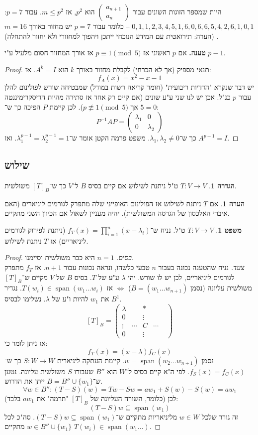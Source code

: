 \documentclass[a4paper]{article}
\DeclareMathOperator{\Sp}      {span}
\newcommand\co        {\colon}
\newcommand\pms[1]    {\begin{pmatrix}
		#1
\end{pmatrix}}
\renewcommand\lg      {\lambda}
\newcommand\op    {^{-1}}
\theoremstyle{definition}
\newtheorem{Theorem}{משפט}
\newtheorem{definition}{הגדרה}
\newtheorem{Remark}{הערה}
\newcommand\theo  [1] {\begin{Theorem}#1\end{Theorem}}
\newcommand\defi  [1] {\begin{definition}#1\end{definition}}
\newcommand\rmark [1] {\begin{Remark}#1\end{Remark}}
\begin{document}
	היות שמספר הזוגות השונים עבור $\pms{a_{n + 1} \\ a_n}$ הוא $p^2$, אז $m \le p^2$. עבור $p = 7$: \hfill $0, 1, 1, 2, 3, 4, 5, 1, 6, 0, 6, 6, 5, 4, 2, 6, 1, 0, 1$ – כלומר עבור $p = 7$ יש מחזור באורך $m = 16$. (הערה: תירואטית עם המידע הנוכחי ייתכן ויהפוך למחזורי ולא יחזור להתחלה)
	
	\textbf{טענה. }אם $p$ ראשוני אז $p \equiv 1 \pmod 5$ אז אורך המחזור חסום מלעיל ע"י $p - 1$. 
	
	\begin{proof}
		תנאי מספיק (אך לא הכרחי) לקבלת מחזור באורך $k$ הוא $A^k = I$. אז: 
		\[ f_A(x) = x^2 - x - 1 \]
		יש דבר שנקרא "הדדיות ריבועית" (חומר קריאה רשות במודל) שמבטיחה שורש לפולינום להלן עבור $p$ כנ"ל. אכן יש לנו שני ע"ע שונים (אם קיים רק אחד אז סתירה מהיות הדיסקרימיננטה $5 = 0$ אך $p \not\equiv 1 \pmod 5$). לכן קיימת $P$ הפיכה כך ש־: 
		\[ P\op AP = \pms{\lg_1 & 0 \\ 0 & \lg_2} \]
		כך ש־$\lg_1, \lg_2 \neq 0$. משפט פרמה הקטן אומר ש־$\lg_1^{p - 1}  = \lg_2^{p - 1} = 1$. ואז $A^{p - 1} = I$. 
	\end{proof}
	
	\subsection{שילוש}
	\defi{$T \co V \to V$ ט"ל ניתנת לשילוש אם קיים בסיס $B$ ל־$V$ כך ש־$[T]_B$ משולשית. }
	
	\rmark{אם $T$ ניתנת לשילוש אז הפולינום האופייני שלה מתפרק לגורמים ליניארים (האם איברי האלכסון של הגרסה המשולשית). יהיה מעניין לשאול אם הכיוון השני מתקיים. }
	
	\theo{$T \co V \to V$ ט"ל. נניח ש־$f_T(x) = \prod_{i = 1}^{n}(x - \lg_i)$ (ניתנת לפירוק לגורמים ליניאריים) אז $T$ ניתנת לשילוש. }
	\begin{proof}
		\textit{בסיס. }$n = 1$ היא כבר משולשית וסיימנו. \\
		\textit{צעד. }נניח שהטענה נכונה בעבור $n$ טבעי כלשהו, ונראה נכונות עבור $n + 1$. אז $f_T$ מתפרק לגורמים ליניאריים, לכן יש לו שורש. יהי $\lg$ ע"ע של $T$. בסיס $B$ של $V$ מקיים ש־$[T]_B$ משולשית עליונה (נסמן $B = (w_1 \dots w_{n + 1})$) $\iff$ אז $T(w_i) \in \Sp(w_1 \dots w_i)$. נגדיר את $w_1$ להיות ו"ע של $\lg$. נשלימו לבסיס $B^1$. 
		\[ [T]_B = \pms{\lg & & * && \\ 0 && \vdots \\ \vdots &\cdots & C & \cdots \\ 0 & &\vdots } \]
		אז ניתן לומר כי: 
		\[ f_T(x) = (x - \lg) f_C(x) \]
		נסמן $w = \Sp(w_2 \dots w_{n + 1})$. קיימת העתקה ליניארית $S \co W \to W$ כך ש־$f_S(x) = f_C(x)$. לפי ה"א קיים בסיס ל־$W$ הוא $B''$ שעבורו $S$ משולשית עליונה. נטען ש־$B = B'' \cup \{w_1\}$ ייתן את הדרוש. 
		\[ \forall w \in B'' \co (T - S)(w) = Tw - Sw = aw_1 + S(w) - S(w) = aw_1 \]
		(כלומר, השורה העליונה של $[T]_B$ "תרמה" את $aw_1$ בלבד)
		לכן: 
		\[ (T - S)w \subseteq \Sp(w_1) \]
		זה גורר שלכל $w \in W$ מליניאריות מתקיים ש־$(T - S)w \subseteq \Sp(w_1)$. סה"כ לכל $w \in B'' \cup \{w_1\}$ מתקיים $T(w_i) \in \Sp(w_1 \dots)$. 
	\end{proof}
	
\end{document}
